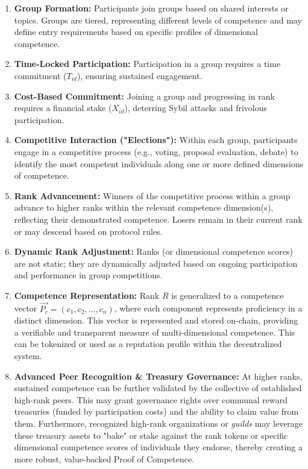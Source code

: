 \documentclass{article}
\begin{document}
\begin{CJK}{UTF8}{gbsn}
    \begin{enumerate}
        \item \textbf{Group Formation:} Participants join groups based on shared interests or topics. Groups are tiered, representing different levels of competence and may define entry requirements based on specific profiles of dimensional competence.
        \item \textbf{Time-Locked Participation:}  Participation in a group requires a time commitment ($T_{id}$), ensuring sustained engagement.
        \item \textbf{Cost-Based Commitment:} Joining a group and progressing in rank requires a financial stake ($X_{id}$), deterring Sybil attacks and frivolous participation.
        \item \textbf{Competitive Interaction ("Elections"):} Within each group, participants engage in a competitive process (e.g., voting, proposal evaluation, debate) to identify the most competent individuals along one or more defined dimensions of competence.
        \item \textbf{Rank Advancement:} Winners of the competitive process within a group advance to higher ranks within the relevant competence dimension(s), reflecting their demonstrated competence. Losers remain in their current rank or may descend based on protocol rules.
        \item \textbf{Dynamic Rank Adjustment:} Ranks (or dimensional competence scores) are not static; they are dynamically adjusted based on ongoing participation and performance in group competitions.
        \item \textbf{Competence Representation:}  Rank $R$ is generalized to a competence vector $\vec{P_c} = (c_1, c_2, ..., c_n)$, where each component represents proficiency in a distinct dimension. This vector is represented and stored on-chain, providing a verifiable and transparent measure of multi-dimensional competence. This can be tokenized or used as a reputation profile within the decentralized system.
        \item \textbf{Advanced Peer Recognition \& Treasury Governance:} At higher ranks, sustained competence can be further validated by the collective of established high-rank peers. This may grant governance rights over communal reward treasuries (funded by participation costs) and the ability to claim value from them. Furthermore, recognized high-rank organizations or \textit{guilds} may leverage these treasury assets to "bake" or stake against the rank tokens or specific dimensional competence scores of individuals they endorse, thereby creating a more robust, value-backed Proof of Competence.
    \end{enumerate}


\end{CJK}
\end{document}
